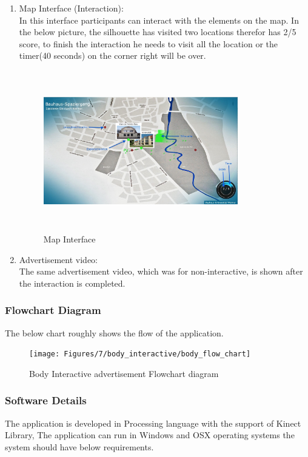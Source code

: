 \begin{enumerate}
\item Map Interface (Interaction): \\
In this interface participants can interact with the elements on the map. In the below picture, the silhouette has visited two locations therefor has 2/5 score, to finish the interaction he needs to visit all the location or the timer(40 seconds) on the corner right will be over.\begin{figure}[H]
    \centering
    \includegraphics[width=0.8\textwidth,height=70mm]{Figures/7/body_interactive/second_interface}
    \caption{Map Interface}%
    \label{fig:body_secondinterface}%
\end{figure}

\item Advertisement video:\\
The same advertisement video, which was for non-interactive, is shown after the interaction is completed.

\end{enumerate}

\iffalse
\subsubsection{Flowchart Diagram}
The below chart roughly shows the flow of the application.
\begin{figure}[H]
    \centering
    \texttt{[image: Figures/7/body\_interactive/body\_flow\_chart]}
    \caption{Body Interactive advertisement Flowchart diagram}%
    \label{fig:Body_flowchat}%
\end{figure}


\subsubsection{Software Details}
The application is developed in Processing language with the support of Kinect Library, The application can run in Windows and OSX operating systems the system should have below requirements.

